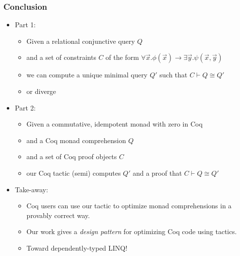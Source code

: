 \documentclass{beamer}
\begin{document}
\begin{frame}
\frametitle{Conclusion}
\begin{itemize}
\item Part 1:
\begin{itemize}
\item Given a relational conjunctive query $Q$ 
\item and a set of constraints $C$ of the form $\forall \vec{x}. \phi(\vec{x}) \to \exists \vec{y}. \psi(\vec{x},\vec{y})$
\item we can compute a unique minimal query $Q'$ such that $C \vdash Q \cong Q'$
\item or diverge 
\end{itemize}
\vspace{.1in}
\item Part 2:
\begin{itemize}
\item Given a commutative, idempotent monad with zero in Coq
\item and a Coq monad comprehension $Q$
\item and a set of Coq proof objects $C$
\item our Coq tactic (semi) computes $Q'$ and a proof that $C \vdash Q \cong Q'$
\end{itemize}
\vspace{.1in}
\item Take-away:
\begin{itemize}
  \item Coq users can use our tactic to optimize monad comprehensions in a provably correct way.
\item Our work gives a {\it design pattern} for optimizing Coq code using tactics.
\item Toward dependently-typed LINQ!
\end{itemize}
\end{itemize}
\end{frame}


\end{document}
